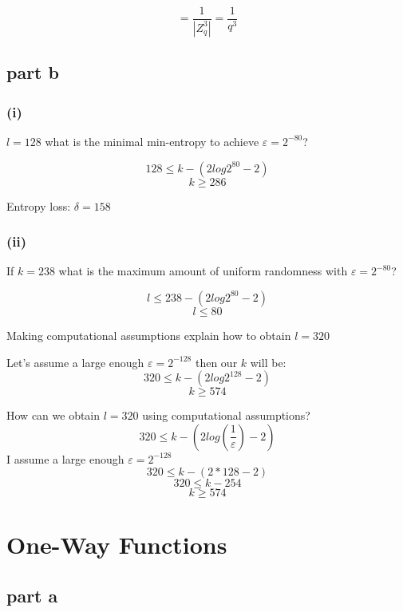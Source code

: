 \documentclass[11pt]{article}
\newcounter{t0d0_counter}
\begin{document}
$$= \frac{1}{|Z_q^3|}=\frac{1}{q^3}$$

\subsection{part b}
\subsubsection{(i)}

$l = 128 $ what is the minimal min-entropy to achieve $\varepsilon = 2^{-80}$?

$$128 \leq k-(2log2^{80} -2)$$
$$k \geq 286$$

Entropy loss: $\delta = 158$

\subsubsection{(ii)}

If $ k = 238 $ what is the maximum amount of uniform randomness with $\varepsilon = 2^{-80}$?

$$l \leq 238-(2log2^{80}-2)$$
$$l \leq 80$$

Making computational assumptions explain how to obtain $ l = 320 $

Let's assume a large enough $\varepsilon = 2^{-128}$ then our $k$ will be:
$$320 \leq k - (2log2^{128}-2)$$    
$$k \geq 574$$ 

How can we obtain $l=320$ using computational assumptions?
$$320\leq k-(2log(\frac{1}{\varepsilon})-2)$$
I assume a large enough $\varepsilon=2^{-128}$ 
$$320\leq k-(2*128-2)$$
$$320\leq k-254$$
$$k\geq574$$

\newpage
\section{One-Way Functions}
\subsection{part a}

\begin{figure}[h!]
   \centering
   \sdinit{}
\end{figure}
\end{document}

